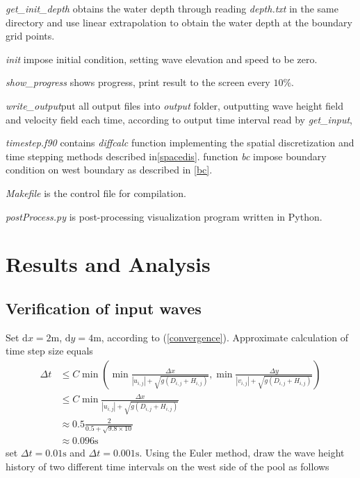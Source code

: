 \documentclass[10pt,a4paper]{article}
\newcommand{\td}{\mbox{d}}
\begin{document}
\textit{get\_init\_depth} obtains the water depth through reading \textit{depth.txt} in the same directory and use linear extrapolation to obtain the water depth at the boundary grid points.

\textit{init} impose initial condition, setting wave elevation and speed to be zero.

\textit{show\_progress} shows progress, print result to the screen every $10\%$.

\textit{write\_output}put all output files into \textit{output} folder, outputting wave height field and velocity field each time, according to output time interval read by \textit{get\_input},

\textit{timestep.f90} contains \textit{diffcalc} function implementing the spatial discretization and time stepping methods described in\ref{spacedis}. function \textit{bc} impose boundary condition on west boundary as described in \ref{bc}.

\textit{Makefile} is the control file for compilation.

\textit{postProcess.py} is post-processing visualization program written in Python.
\newpage
\section{Results and Analysis}
\subsection{Verification of input waves}
Set $\td x= 2 \mbox{m}$, $\td y = 4 \mbox{m}$, according to (\ref{convergence}). Approximate calculation of time step size equals
\begin{equation}
	\begin{aligned}
		\Delta t &\le C\min\left(\min\frac{\Delta x}{|u_{i, j}| + \sqrt{g(D_{i, j} + H_{i, j})}}, \min\frac{\Delta y}{|v_{i, j}| + \sqrt{g(D_{i, j} + H_{i, j})}}\right) \\ &\le C\min\frac{\Delta x}{|u_{i, j}| + \sqrt{g(D_{i, j} + H_{i, j})}}\\
		&\approx 0.5\frac{2}{0.5 + \sqrt{9.8\times10}}\\
		&\approx 0.096\mbox{s}
	\end{aligned}
\end{equation}
set $\Delta t=0.01\mbox{s}$ and $\Delta t=0.001\mbox{s}$. Using the Euler method, draw the wave height history of two different time intervals on the west side of the pool as follows
\end{document}

